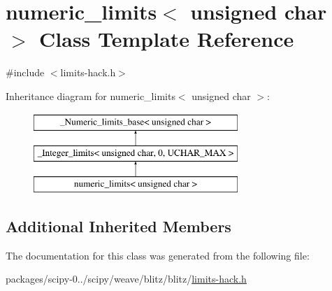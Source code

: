 \hypertarget{classnumeric__limits_3_01unsigned_01char_01_4}{}\section{numeric\+\_\+limits$<$ unsigned char $>$ Class Template Reference}
\label{classnumeric__limits_3_01unsigned_01char_01_4}


{\ttfamily \#include $<$limits-\/hack.\+h$>$}

Inheritance diagram for numeric\+\_\+limits$<$ unsigned char $>$\+:\begin{figure}[H]
\begin{center}
\leavevmode
\includegraphics[height=3.000000cm]{classnumeric__limits_3_01unsigned_01char_01_4}
\end{center}
\end{figure}
\subsection*{Additional Inherited Members}


The documentation for this class was generated from the following file\+:\begin{DoxyCompactItemize}
\item 
packages/scipy-\/0../scipy/weave/blitz/blitz/\hyperlink{limits-hack_8h}{limits-\/hack.\+h}\end{DoxyCompactItemize}
